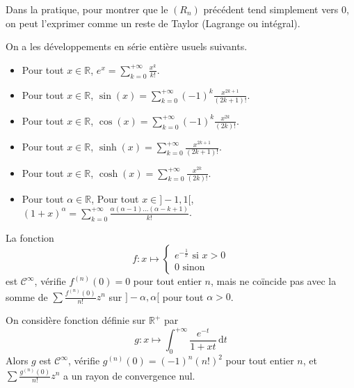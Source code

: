   \begin{remark}
    Dans la pratique, pour montrer que le $(R_n)$ précédent tend simplement vers $0$, on peut l'exprimer comme un reste de Taylor (Lagrange ou intégral).
  \end{remark}

  \begin{example}
    On a les développements en série entière usuels suivants.
    \begin{itemize}
      \item Pour tout $x \in \mathbb{R}$, $e^x = \sum_{k=0}^{+\infty} \frac{x^k}{k!}$.
      \item Pour tout $x \in \mathbb{R}$, $\sin(x) = \sum_{k=0}^{+\infty} (-1)^{k} \frac{x^{2k+1}}{(2k+1)!}$.
      \item Pour tout $x \in \mathbb{R}$, $\cos(x) = \sum_{k=0}^{+\infty} (-1)^{k} \frac{x^{2k}}{(2k)!}$.
      \item Pour tout $x \in \mathbb{R}$, $\sinh(x) = \sum_{k=0}^{+\infty} \frac{x^{2k+1}}{(2k+1)!}$.
      \item Pour tout $x \in \mathbb{R}$, $\cosh(x) = \sum_{k=0}^{+\infty} \frac{x^{2k}}{(2k)!}$.
      \item Pour tout $\alpha \in \mathbb{R}$, Pour tout $x \in ]-1,1[$, $(1+x)^\alpha = \sum_{k=0}^{+\infty} \frac{\alpha(\alpha - 1) \dots (\alpha -k+1)}{k!}$.
    \end{itemize}
  \end{example}

  \begin{cexample}
    La fonction
    \[
    f : x \mapsto \begin{cases}
      e^{-\frac{1}{x}} \text{ si } x > 0 \\
      0 \text{ sinon}
    \end{cases}
    \]
    est $\mathcal{C}^\infty$, vérifie $f^{(n)}(0) = 0$ pour tout entier $n$, mais ne coïncide pas avec la somme de $\sum \frac{f^{(n)}(0)}{n!} z^n$ sur $]-\alpha,\alpha[$ pour tout $\alpha > 0$.
  \end{cexample}

  \begin{cexample}
    On considère fonction définie sur $\mathbb{R}^+$ par
    \[ g : x \mapsto \int_0^{+\infty} \frac{e^{-t}}{1+xt} \, \mathrm{d}t \]
    Alors $g$ est $\mathcal{C}^\infty$, vérifie $g^{(n)}(0) = (-1)^n (n!)^2$ pour tout entier $n$, et $\sum \frac{g^{(n)}(0)}{n!} z^n$ a un rayon de convergence nul.
  \end{cexample}

